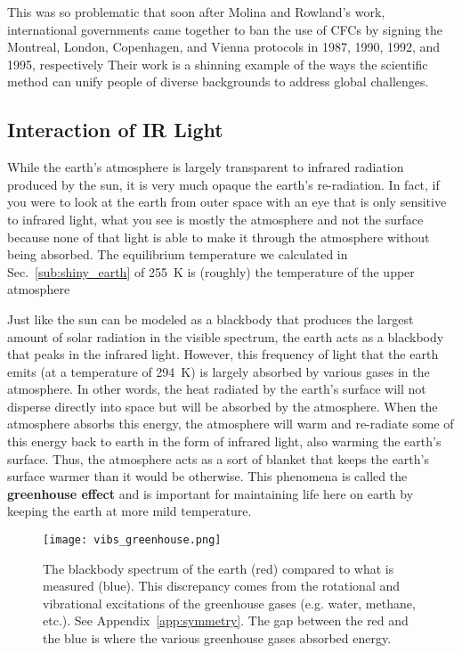     This was so problematic that soon after Molina and Rowland's work, international governments came together to ban the use of CFCs by signing the Montreal, London, Copenhagen, and Vienna protocols in 1987, 1990, 1992, and 1995, respectively \citep{spiro2012chemistry} Their work is a shinning example of the ways the scientific method can unify people of diverse backgrounds to address global challenges.


    \subsection{Interaction of IR Light} %
    \label{sub:ir_light}

    While the earth's atmosphere is largely transparent to infrared radiation produced by the sun, it is very much opaque the earth's re-radiation. In fact, if you were to look at the earth from outer space with an eye that is only sensitive to infrared light, what you see is mostly the atmosphere and not the surface because none of that light is able to make it through the atmosphere without being absorbed. The equilibrium temperature we calculated in Sec.~\ref{sub:shiny_earth} of \SI{255}{\kelvin} is (roughly) the temperature of the upper atmosphere \citep{schroeder1999introduction} 

    Just like the sun can be modeled as a blackbody that produces the largest amount of solar radiation in the visible spectrum, the earth acts as a blackbody that peaks in the infrared light. However, this frequency of light that the earth emits (at a temperature of \SI{294}{\kelvin}) is largely absorbed by various gases in the atmosphere. In other words, the heat radiated by the earth's surface will not disperse directly into space but will be absorbed by the atmosphere. When the atmosphere absorbs this energy, the atmosphere will warm and re-radiate some of this energy back to earth in the form of infrared light, also warming the earth's surface. Thus, the atmosphere acts as a sort of blanket that keeps the earth's surface warmer than it would be otherwise. This phenomena is called the \textbf{greenhouse effect} and is important for maintaining life here on earth by keeping the earth at more mild temperature.

    \begin{figure}[ht]
        \centering
        \texttt{[image: vibs\_greenhouse.png]}
        \caption{The blackbody spectrum of the earth (red) compared to what is measured (blue). This discrepancy comes from the rotational and vibrational excitations of the greenhouse gases (e.g. water, methane, etc.). See Appendix~\ref{app:symmetry}. The gap between the red and the blue is where the various greenhouse gases absorbed energy.}
        \label{fig:earth_bb}
    \end{figure}

